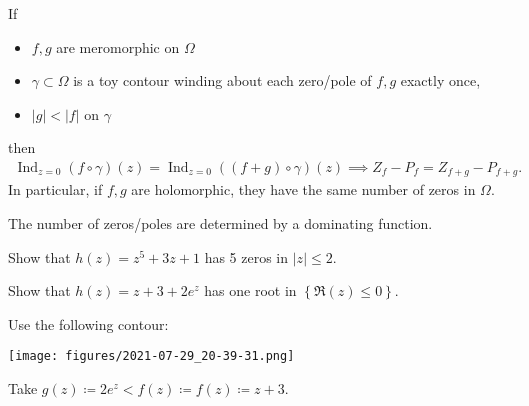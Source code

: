 \begin{theorem}\label{Rouche}

If

\begin{itemize}
\tightlist
\item
  \(f, g\) are meromorphic on \(\Omega\)
\item
  \(\gamma \subset \Omega\) is a toy contour winding about each
  zero/pole of \(f, g\) exactly once,
\item
  \({\left\lvert {g} \right\rvert} < {\left\lvert {f} \right\rvert}\) on
  \(\gamma\)
\end{itemize}

then
\begin{align*}
\mathop{\mathrm{Ind}}_{z=0}(f\circ \gamma)(z) = \mathop{\mathrm{Ind}}_{z=0}((f+g)\circ \gamma)(z) \implies Z_f - P_f = Z_{f+g} - P_{f+g}
.\end{align*}
In particular, if \(f, g\) are holomorphic, they have the same number of
zeros in \(\Omega\).

\end{theorem}

\begin{slogan}

The number of zeros/poles are determined by a dominating function.

\end{slogan}


\begin{exercise}[?]

Show that \(h(z) =z^5 + 3z + 1\) has 5 zeros in
\({\left\lvert {z} \right\rvert} \leq 2\).

\end{exercise}

\begin{exercise}[?]

Show that \(h(z) = z + 3 + 2e^z\) has one root in
\(\left\{{ \Re(z) \leq 0}\right\}\).

\end{exercise}

\begin{solution}

Use the following contour:

\texttt{[image: figures/2021-07-29\_20-39-31.png]}

Take \(g(z) \coloneqq 2e^z < f(z) \coloneqq f(z) \coloneqq z+3\).

\end{solution}

